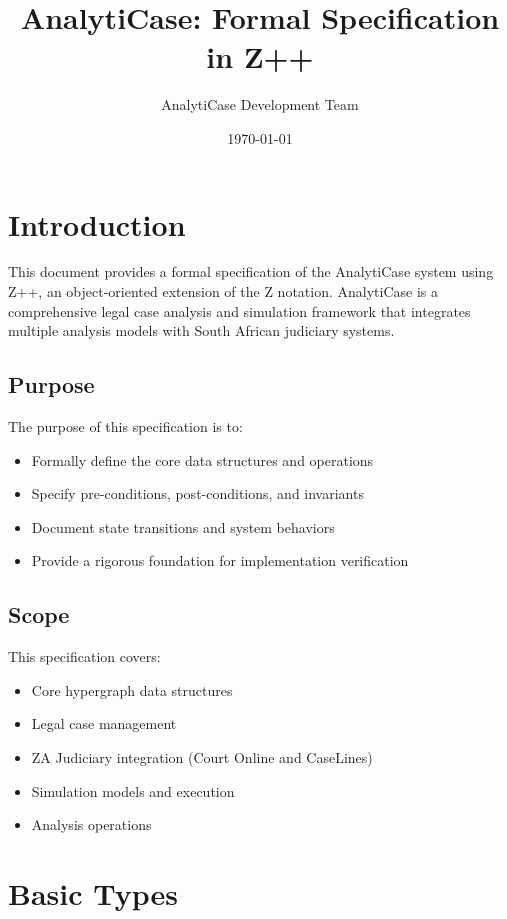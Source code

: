 \documentclass{article}
\title{AnalytiCase: Formal Specification in Z++}
\author{AnalytiCase Development Team}
\date{\today}
\begin{document}
\maketitle

\tableofcontents
\newpage

\section{Introduction}

This document provides a formal specification of the AnalytiCase system using Z++, 
an object-oriented extension of the Z notation. AnalytiCase is a comprehensive 
legal case analysis and simulation framework that integrates multiple analysis models 
with South African judiciary systems.

\subsection{Purpose}

The purpose of this specification is to:
\begin{itemize}
    \item Formally define the core data structures and operations
    \item Specify pre-conditions, post-conditions, and invariants
    \item Document state transitions and system behaviors
    \item Provide a rigorous foundation for implementation verification
\end{itemize}

\subsection{Scope}

This specification covers:
\begin{itemize}
    \item Core hypergraph data structures
    \item Legal case management
    \item ZA Judiciary integration (Court Online and CaseLines)
    \item Simulation models and execution
    \item Analysis operations
\end{itemize}

\newpage

\section{Basic Types}
\end{document}
